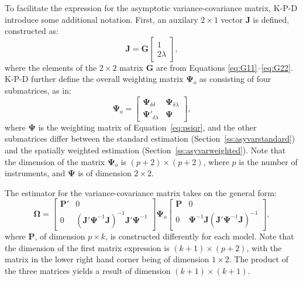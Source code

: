 \documentclass{article}
\begin{document}
To facilitate the expression for the asymptotic variance-covariance matrix,
K-P-D introduce some additional notation. First, an auxilary $2 \times 1$ vector $\mathbf{J}$
is defined, constructed as:
\begin{equation}\label{eq:J}
\mathbf{J} = \mathbf{G}
\left[
\begin{matrix}
1 \\
2 \lambda
\end{matrix}
\right],
\end{equation}
where the elements of the $2 \times 2$ matrix $\mathbf{G}$ are from Equations
\ref{eq:G11}--\ref{eq:G22}.
K-P-D further define the overall weighting matrix $\mathbf{\mathbf{\Psi}}_o$ as consisting of four
submatrices, as in:
\begin{equation*}
\mathbf{\mathbf{\Psi}}_o =
\left[
\begin{matrix}
\mathbf{\Psi}_{\delta \delta} & \mathbf{\Psi}_{\delta \lambda}\\
\mathbf{\Psi}'_{\delta \lambda} & \mathbf{\Psi}
\end{matrix}
\right],
\end{equation*}
where $\mathbf{\Psi}$ is the weighting matrix of Equation~\ref{eq:psiqr}, and the other
submatrices differ between the standard estimation (Section~\ref{ss:asyvarstandard})
and the spatially weighted estimation (Section~\ref{ss:asyvarweighted}). Note that the 
dimension of the matrix $\mathbf{\Psi}_o$ is $(p + 2) \times (p + 2)$, where $p$ is the
number of instruments, and $\mathbf{\Psi}$ is of dimension
$2 \times 2$.

The estimator for the variance-covariance matrix takes on the general form:
\begin{equation}\label{eq:genericOmega}
\mathbf{\Omega} =
\left[
\begin{matrix}
\mathbf{P'} & 0\\
0 & (\mathbf{J'} \mathbf{\Psi}^{-1} \mathbf{J} )^{-1} \mathbf{J'} \mathbf{\Psi}^{-1} 
\end{matrix}
\right]
\mathbf{\Psi}_o
\left[
\begin{matrix}
\mathbf{P} & 0\\
0 &  \mathbf{\Psi}^{-1} \mathbf{J}  (\mathbf{J'} \mathbf{\Psi}^{-1} \mathbf{J} )^{-1}  
\end{matrix}
\right],
\end{equation}
where $\mathbf{P}$, of dimension $p \times k$, is constructed differently for each model.
Note that the dimension of the first matrix expression is $(k + 1) \times (p + 2)$, with
the matrix in the lower right hand corner being of dimension $1 \times 2$. The product
of the three matrices yields a result of dimension $(k + 1) \times (k + 1)$.
\end{document}
